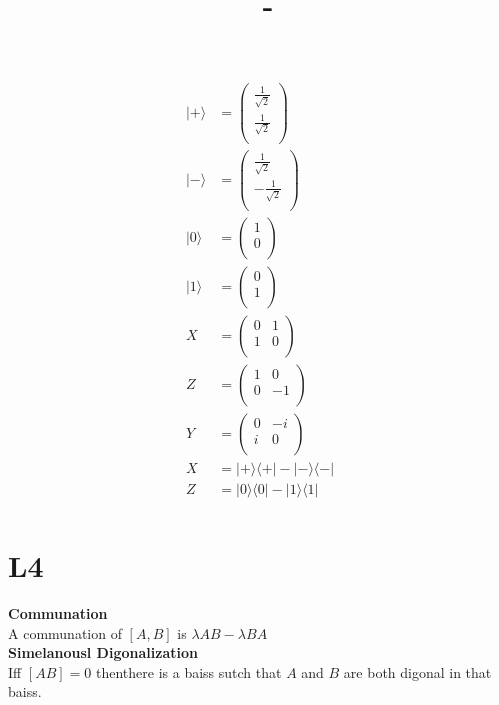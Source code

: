 \documentclass[answers,12pt,addpoints]{exam}
\author{\name}
\title{\course \ - \assignment}
\begin{document}
\maketitle


\newpage
\begin{align*}
    |+\rangle &= \begin{pmatrix}
        \frac{1}{\sqrt{2}} \\
        \frac{1}{\sqrt{2}} \\
        \end{pmatrix} \\
    |-\rangle &= \begin{pmatrix}
        \frac{1}{\sqrt{2}} \\
        -\frac{1}{\sqrt{2}} \\
        \end{pmatrix} \\
    |0\rangle &= \begin{pmatrix}
        1 \\
        0 \\
        \end{pmatrix} \\
    |1\rangle &= \begin{pmatrix}
        0 \\
        1 \\
        \end{pmatrix} \\
    X &= \begin{pmatrix}
        0 & 1 \\
        1 & 0 \\
        \end{pmatrix} \\
    Z &= \begin{pmatrix}
        1 & 0 \\
        0 & -1 \\
        \end{pmatrix} \\
    Y &= \begin{pmatrix}
        0 & -i \\
        i & 0 \\
        \end{pmatrix} \\
    X &= |+\rangle \langle +| - |-\rangle \langle -| \\
    Z &= |0\rangle \langle 0| - |1\rangle \langle 1| \\
\end{align*}
\section*{L4}
\textbf{Communation}\\
A communation of $[A,B]$ is $\lambda AB - \lambda BA$ \\
\textbf{Simelanousl Digonalization}\\
Iff $[AB]=0$ thenthere is a baiss sutch that $A$ and $B$ are both digonal in that baiss.\\
\end{document}
